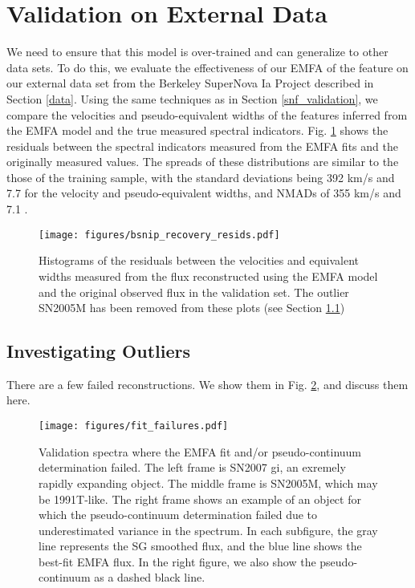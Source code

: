 \section{Validation on External Data}
We need to ensure that this model is over-trained and can generalize to other data sets. To do this, we evaluate the effectiveness of our EMFA of the feature on our external data set from the Berkeley SuperNova Ia Project \citep[BSNIP,][]{silverman_berkeley_2012} described in Section \ref{data}. Using the same techniques as in Section \ref{snf_validation}, we compare the velocities and pseudo-equivalent widths of the features inferred from the EMFA model and the true measured spectral indicators. Fig. \ref{bsnip_hist_resids} shows the residuals between the spectral indicators measured from the EMFA fits and the originally measured values. The spreads of these distributions are similar to the those of the training sample, with the standard deviations being 392 km/s and 7.7 \angstrom\; for the velocity and pseudo-equivalent widths, and NMADs of 355 km/s and 7.1 \angstrom.

\begin{figure}[!htb]
    \centering
    \texttt{[image: figures/bsnip\_recovery\_resids.pdf]}
    \caption{Histograms of the residuals between the velocities and equivalent widths measured from the flux reconstructed using the EMFA model and the original observed flux in the validation set. The outlier SN2005M has been removed from these plots (see Section \ref{outliers})}
    \label{bsnip_hist_resids}
\end{figure}

\subsection{Investigating Outliers}
\label{outliers}
There are a few failed reconstructions. We show them in Fig. \ref{valid_failures}, and discuss them here.

\begin{figure}[!htb]
    \centering
    \texttt{[image: figures/fit\_failures.pdf]}
    \caption{Validation spectra where the EMFA fit and/or pseudo-continuum determination failed. The left frame is SN2007 gi, an exremely rapidly expanding object. The middle frame is SN2005M, which may be 1991T-like. The right frame shows an example of an object for which the pseudo-continuum determination failed due to underestimated variance in the spectrum. In each subfigure, the gray line represents the SG smoothed flux, and the blue line shows the best-fit EMFA flux. In the right figure, we also show the pseudo-continuum as a dashed black line.}
    \label{valid_failures}
\end{figure}

